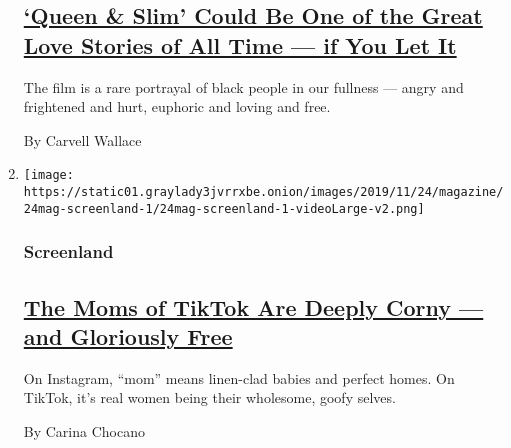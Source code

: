 \begin{enumerate}
  \hypertarget{queen--slim-could-be-one-of-the-great-love-stories-of-all-time--if-you-let-it}{%
  \subsection{\texorpdfstring{\href{/2019/11/21/magazine/queen-slim-movie.html}{`Queen
  \& Slim' Could Be One of the Great Love Stories of All Time --- if You
  Let
  It}}{`Queen \& Slim' Could Be One of the Great Love Stories of All Time --- if You Let It}}\label{queen--slim-could-be-one-of-the-great-love-stories-of-all-time--if-you-let-it}}

  The film is a rare portrayal of black people in our fullness --- angry
  and frightened and hurt, euphoric and loving and free.

  By Carvell Wallace
\item
  \texttt{[image: https://static01.graylady3jvrrxbe.onion/images/2019/11/24/magazine/24mag-screenland-1/24mag-screenland-1-videoLarge-v2.png]}

  \hypertarget{screenland}{%
  \subsubsection{Screenland}\label{screenland}}

  \hypertarget{the-moms-of-tiktok-are-deeply-corny--and-gloriously-free}{%
  \subsection{\texorpdfstring{\href{/2019/11/20/magazine/tiktok-mom.html}{The
  Moms of TikTok Are Deeply Corny --- and Gloriously
  Free}}{The Moms of TikTok Are Deeply Corny --- and Gloriously Free}}\label{the-moms-of-tiktok-are-deeply-corny--and-gloriously-free}}

  On Instagram, ``mom'' means linen-clad babies and perfect homes. On
  TikTok, it's real women being their wholesome, goofy selves.

  By Carina Chocano
\end{enumerate}

